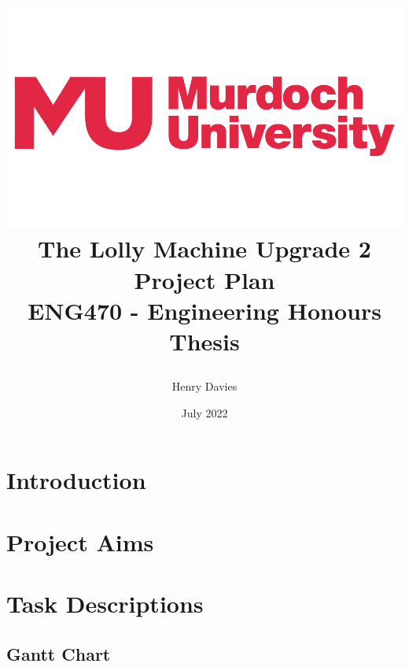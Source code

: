 \documentclass{article}
\title  {\begin{center}
            \includegraphics[scale = 0.2]{murdochLogo} 
            \vspace{10mm}
            \\\Huge The Lolly Machine Upgrade 2
            \vspace{20mm}
            \\\Large Project Plan
            \vspace{5mm}
            \\ENG470 - Engineering Honours Thesis
            \vspace{30mm} 
        \end{center}}
\author{Henry Davies}
\date{July 2022}
\begin{document}
\maketitle
\newpage

\tableofcontents
\newpage


\section{Introduction}

\newpage

\section{Project Aims}
    
    \newpage

\section{Task Descriptions}
    

\begin{landscape}
    \section {Gantt Chart}
        \centering
        
\end{landscape}
\restoregeometry

\printbibliography
\end{document}
